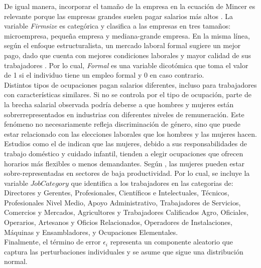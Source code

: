 \documentclass[12pt,a4paper,onecolumn]{article}
\begin{document}
De igual manera, incorporar el tamaño de la empresa en la ecuación de Mincer es relevante porque las empresas grandes suelen pagar salarios más altos \citep{brown1989, troske1999}. La variable \textit{Firmsize} es categórica y clasifica a las empresas en tres tamaños: microempresa, pequeña empresa y mediana-grande empresa. En la misma línea, según el enfoque estructuralista, un mercado laboral formal sugiere un mejor pago, dado que cuenta con mejores condiciones laborales y mayor calidad de sus trabajadores \citep{uribe2006}. Por lo cual, \textit{Formal} es una variable dicotómica que toma el valor de 1 si el individuo tiene un empleo formal y 0 en caso contrario. \\

Distintos tipos de ocupaciones pagan salarios diferentes, incluso para trabajadores con características similares. Si no se controla por el tipo de ocupación, parte de la brecha salarial observada podría deberse a que hombres y mujeres están sobrerrepresentados en industrias con diferentes niveles de remuneración. Este fenómeno no necesariamente refleja discriminación de género, sino que puede estar relacionado con las elecciones laborales que los hombres y las mujeres hacen. Estudios como el de \cite{tenjo2005} indican que las mujeres, debido a sus responsabilidades de trabajo doméstico y cuidado infantil, tienden a elegir ocupaciones que ofrecen horarios más flexibles o menos demandantes. Según \cite{arriagada1998}, las mujeres pueden estar sobre-representadas en sectores de baja productividad. Por lo cual, se incluye la variable $JobCategory$ que identifica a los trabajadores en las categorias de: Directores y Gerentes, Profesionales, Científicos e Intelectuales, Técnicos, Profesionales Nivel Medio, Apoyo Administrativo, Trabajadores de Servicios, Comercios y Mercados, Agricultores y Trabajadores Calificados Agro, Oficiales, Operarios, Artesanos y Oficios Relacionados, Operadores de Instalaciones, Máquinas y Ensambladores, y Ocupaciones Elementales. \\

Finalmente, el término de error $\epsilon_i$ representa un componente aleatorio que captura las perturbaciones individuales y se asume que sigue una distribución normal. \\
\end{document}
